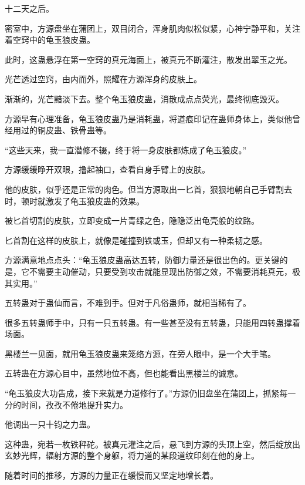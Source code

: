 
\begin{this_body}



十二天之后。

密室中，方源盘坐在蒲团上，双目闭合，浑身肌肉似松似紧，心神宁静平和，关注着空窍中的龟玉狼皮蛊。

此时，这蛊悬浮在第一空窍的真元海面上，被真元不断灌注，散发出翠玉之光。

光芒透过空窍，由内而外，照耀在方源浑身的皮肤上。

渐渐的，光芒黯淡下去。整个龟玉狼皮蛊，消散成点点荧光，最终彻底毁灭。

方源早有心理准备，龟玉狼皮蛊乃是消耗蛊，将道痕印记在蛊师身体上，类似他曾经用过的铜皮蛊、铁骨蛊等。

“这些天来，我一直潜修不辍，终于将一身皮肤都炼成了龟玉狼皮。”

方源缓缓睁开双眼，撸起袖口，查看自身手臂上的皮肤。

他的皮肤，似乎还是正常的肉色。但当方源取出一匕首，狠狠地朝自己手臂割去时，顿时就激发了龟玉狼皮蛊的效果。

被匕首切割的皮肤，立即变成一片青绿之色，隐隐泛出龟壳般的纹路。

匕首割在这样的皮肤上，就像是碰撞到铁或玉，但却又有一种柔韧之感。

方源满意地点点头：“龟玉狼皮蛊高达五转，防御力量还是很出色的。更关键的是，它不需要主动催动，只要受到攻击就能显现出防御之效，不需要消耗真元，极其实用。”

五转蛊对于蛊仙而言，不难到手。但对于凡俗蛊师，就相当稀有了。

很多五转蛊师手中，只有一只五转蛊。有一些甚至没有五转蛊，只能用四转蛊撑着场面。

黑楼兰一见面，就用龟玉狼皮蛊来笼络方源，在旁人眼中，是一个大手笔。

五转蛊在方源心目中，虽然地位不高，但也能看出黑楼兰的诚意。

“龟玉狼皮大功告成，接下来就是力道修行了。”方源仍旧盘坐在蒲团上，抓紧每一分的时间，孜孜不倦地提升实力。

他调出一只十钧之力蛊。

这种蛊，宛若一枚铁秤砣。被真元灌注之后，悬飞到方源的头顶上空，然后绽放出玄妙光辉，辐射方源的整个身躯，将力道的某段道纹印刻在他的身上。

随着时间的推移，方源的力量正在缓慢而又坚定地增长着。


\end{this_body}
